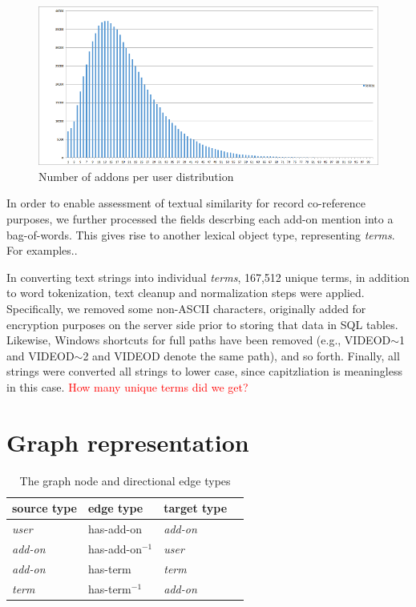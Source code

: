 \documentclass[11pt,oneside]{book}
\let\Oldsection\section
\renewcommand{\section}{\FloatBarrier\Oldsection}
\begin{document}
\begin{figure}[t]
\centering
\begin{small}
\includegraphics[scale=.9,angle=0]{figures/user_addons_histogram.png}
\end{small}
\caption{Number of addons per user distribution}
\label{fig:user_addons_histogram}
\end{figure}

In order to enable assessment of textual similarity for record co-reference purposes, we further processed the fields descrbing each add-on mention into a bag-of-words. This gives rise to another lexical object type, representing {\it terms}. For examples..

In converting text strings into individual {\it terms}, 167,512 unique terms, in addition to word tokenization, text cleanup and normalization steps were applied. Specifically, we removed some non-ASCII characters, originally added for encryption purposes on the server side prior to storing that data in SQL tables. Likewise,  Windows shortcuts for full paths have been removed (e.g., VIDEOD$\sim$1 and VIDEOD$\sim$2 and VIDEOD denote the same path), and so forth. Finally, all strings were converted all strings to lower case, since capitzliation is meaningless in this case. \textcolor{red}{How many unique terms did we get?}


\section{Graph representation}

\begin{table}[t]
\begin{center}
\begin{small}
\begin{tabular}{llll}
\hline 
\textbf{source type} & \textbf{edge type} & \textbf{target type} \\
\hline
{\it user} & has-add-on & {\it add-on} \\
\hline
{\it add-on} &  has-add-on$^{-1}$ & {\it user} \\
{\it add-on} & has-term & {\it term} \\
\hline
{\it term} & has-term$^{-1}$ & {\it add-on} \\
\hline
\end{tabular}
\end{small}
\end{center}
\caption{\label{tab:graph_structure} The graph node and directional edge types}
\end{table}
\end{document}

